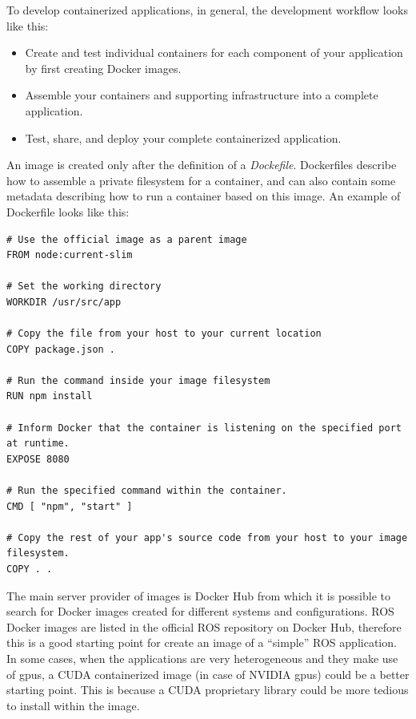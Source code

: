 To develop containerized applications, in general, the development workflow looks like this:
\begin{itemize}
	\item Create and test individual containers for each component of your application by first creating Docker images.
	\item Assemble your containers and supporting infrastructure into a complete application.
	\item Test, share, and deploy your complete containerized application.
\end{itemize}

An image is created only after the definition of a \textit{Dockefile}. Dockerfiles describe how to assemble a private filesystem for a container, and can also contain some metadata describing how to run a container based on this image. An example of Dockerfile looks like this:

\begin{verbatim}
# Use the official image as a parent image
FROM node:current-slim

# Set the working directory
WORKDIR /usr/src/app

# Copy the file from your host to your current location
COPY package.json .

# Run the command inside your image filesystem
RUN npm install

# Inform Docker that the container is listening on the specified port at runtime.
EXPOSE 8080

# Run the specified command within the container.
CMD [ "npm", "start" ]

# Copy the rest of your app's source code from your host to your image filesystem.
COPY . .
\end{verbatim}


The main server provider of images is Docker Hub \cite{DockerHub} from which it is possible to search for Docker images created for different systems and configurations.
ROS Docker images are listed in the official ROS repository on Docker Hub, therefore this is a good starting point for create an image of a ``simple'' ROS application.
In some cases, when the applications are very heterogeneous and they make use of gpus, a CUDA containerized image (in case of NVIDIA gpus) could be a better starting point.
This is because a CUDA proprietary library could be more tedious to install within the image.

